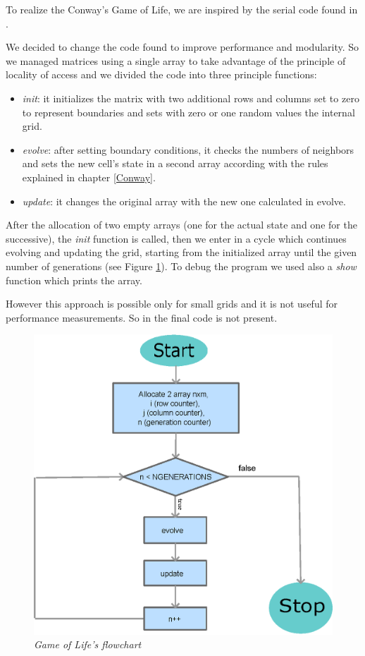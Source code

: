 \documentclass[a4paper,11pt,twoside]{report}
\begin{document}
\noindent To realize the Conway's Game of Life, we are inspired by the serial code found in \cite{code}.

\noindent We decided to change the code found to improve performance and modularity.
So we managed matrices using a single array to take advantage of the principle of locality of access and we divided the code into three principle functions:
\begin{itemize}

	\item \emph{init}: it initializes the matrix with two additional rows and columns set to zero to represent boundaries and sets with zero or one random values the internal grid.
	\item \emph{evolve}: after setting boundary conditions, it checks the numbers of neighbors and
	sets the new cell's state in a second array according with the rules explained in chapter \ref{Conway}.
	\item \emph{update}: it changes the original array with the new one calculated in evolve.

\end{itemize}

\noindent After the allocation of two empty arrays (one for the actual state and one for the successive), the \emph{init} function is called, then we enter in a cycle which continues evolving and updating the grid, starting from the initialized array until the given number of generations (see Figure \ref{fig:1}).
To debug the program we used also a \emph{show} function which prints the array.

\noindent However this approach is possible only for small grids and it is not useful for performance measurements. So in the final code is not present.
\begin{figure}
	\centering
	\includegraphics[scale = 0.8]{chart.eps}
	\caption{\emph{Game of Life's flowchart}}\label{fig:1}
\end{figure}
\end{document}
